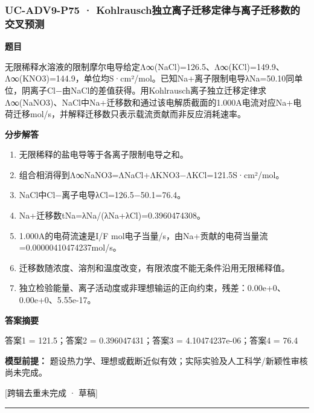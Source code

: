 \documentclass[UTF8,11pt,a4paper]{ctexart}
\begin{document}
\subsubsection*{UC-ADV9-P75 · Kohlrausch独立离子迁移定律与离子迁移数的交叉预测}
\noindent\textbf{题目}\par
无限稀释水溶液的限制摩尔电导给定Λ∞(NaCl)=126.5、Λ∞(KCl)=149.9、Λ∞(KNO3)=144.9，单位均S·cm²/mol。已知Na+离子限制电导λNa=50.10同单位，阴离子Cl−由NaCl的差值获得。用Kohlrausch离子独立迁移定律求Λ∞(NaNO3)、NaCl中Na+迁移数和通过该电解质截面的1.000A电流对应Na+电荷迁移mol/s，并解释迁移数只表示载流贡献而非反应消耗速率。\par
\medskip\noindent\textbf{分步解答}
\begin{enumerate}
\item 无限稀释的盐电导等于各离子限制电导之和。
\item 组合相消得到Λ∞NaNO3=ΛNaCl+ΛKNO3−ΛKCl=121.5S·cm²/mol。
\item NaCl中Cl−离子电导λCl=126.5−50.1=76.4。
\item Na+迁移数tNa=λNa/(λNa+λCl)=0.3960474308。
\item 1.000A的电荷流速是I/F mol电子当量/s，由Na+贡献的电荷当量流=0.00000410474237mol/s。
\item 迁移数随浓度、溶剂和温度改变，有限浓度不能无条件沿用无限稀释值。
\item 独立检验能量、离子活动度或非理想输运的正向约束，残差：0.00e+0、0.00e+0、5.55e-17。
\end{enumerate}
\noindent\textbf{答案摘要}\par
答案1 = 121.5；答案2 = 0.396047431；答案3 = 4.10474237e-06；答案4 = 76.4\par
\noindent\textbf{模型前提：}
题设热力学、理想或截断近似有效；实际实验及人工科学/新颖性审核尚未完成。\par
\noindent\textcolor{red!65!black}{[跨辑去重未完成 · 草稿]} \par
\medskip\hrule\medskip
{}
\end{document}
